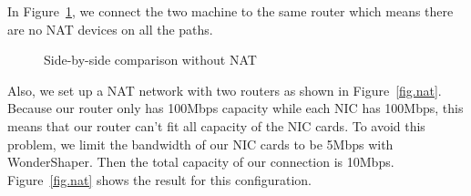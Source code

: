 In Figure~\ref{fig.nonat}, we connect the two machine to the same router which means there are no NAT devices on all the paths.

\begin{figure}[htb]
\caption{Side-by-side comparison without NAT}
\label{fig.nonat}
\end{figure}

Also, we set up a NAT network with two routers as shown in Figure~\ref{fig.nat}. Because our router only has 100Mbps capacity while each NIC has 100Mbps, this means that our router can't fit all capacity of the NIC cards. To avoid this problem, we limit the bandwidth of our NIC cards to be 5Mbps with WonderShaper. Then the total capacity of our connection is 10Mbps. Figure~\ref{fig.nat} shows the result for this configuration.

